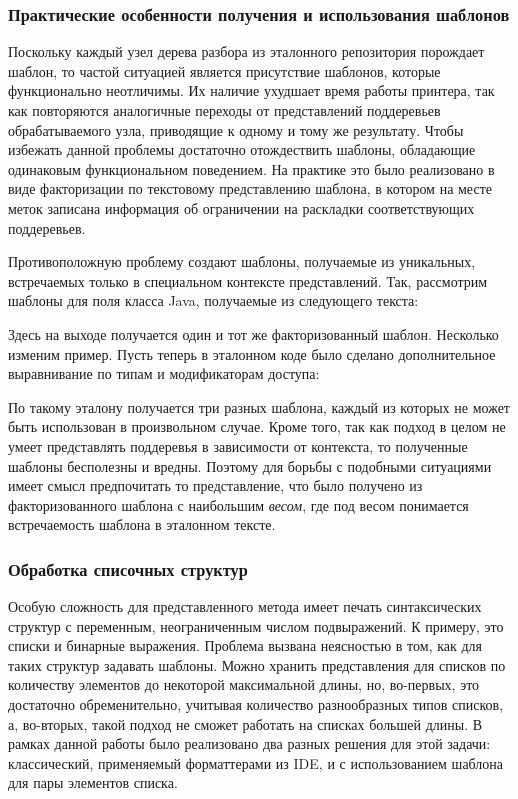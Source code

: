 \subsubsection{Практические особенности получения и использования шаблонов}

Поскольку каждый узел дерева разбора из эталонного репозитория порождает
шаблон, то частой ситуацией является присутствие шаблонов, которые функционально
неотличимы. Их наличие ухудшает время работы принтера, так как повторяются
аналогичные переходы от представлений поддеревьев обрабатываемого узла, приводящие
к одному и тому же результату. Чтобы избежать данной проблемы достаточно
отождествить шаблоны, обладающие одинаковым функциональном поведением.
На практике это было реализовано в виде факторизации по текстовому представлению
шаблона, в котором на месте меток записана информация об ограничении на раскладки
соответствующих поддеревьев.

Противоположную проблему создают шаблоны, получаемые из уникальных,
встречаемых только в специальном контексте представлений.
Так, рассмотрим шаблоны для поля класса Java,
получаемые из следующего текста:



Здесь на выходе получается один и тот же факторизованный шаблон.
Несколько изменим пример. Пусть теперь
в эталонном коде было сделано дополнительное выравнивание по типам
и модификаторам доступа:



По такому эталону получается три разных шаблона, каждый из которых не может
быть использован в произвольном случае. Кроме того, так как подход в целом не
умеет представлять поддеревья в зависимости от контекста, то полученные шаблоны
бесполезны и вредны. Поэтому для борьбы с подобными ситуациями имеет смысл
предпочитать то представление, что было получено из факторизованного шаблона с
наибольшим \emph{весом}, где под весом понимается встречаемость шаблона в
эталонном тексте.

\newpage
\subsubsection{Обработка списочных структур}

Особую сложность для представленного метода имеет
печать синтаксических структур с переменным, неограниченным числом
подвыражений. К примеру, это списки и бинарные выражения. Проблема вызвана
неясностью в том, как для таких структур задавать шаблоны. Можно хранить
представления для списков по количеству элементов
до некоторой максимальной длины, но,
во-первых, это достаточно обременительно, учитывая количество разнообразных
типов списков, а, во-вторых, такой подход не сможет работать на списках большей
длины. В рамках данной работы было реализовано два разных решения для этой
задачи: классический, применяемый форматтерами из IDE, и с использованием
шаблона для пары элементов списка.

